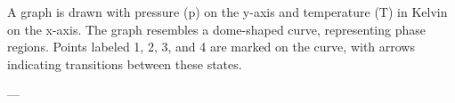 A graph is drawn with pressure (p) on the y-axis and temperature (T) in Kelvin on the x-axis. The graph resembles a dome-shaped curve, representing phase regions. Points labeled 1, 2, 3, and 4 are marked on the curve, with arrows indicating transitions between these states.

---